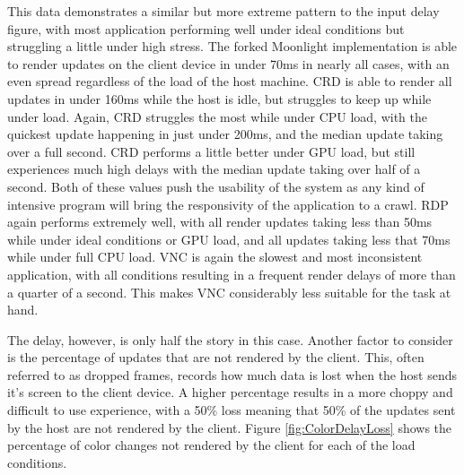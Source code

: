 This data demonstrates a similar but more extreme pattern to the input delay figure, with most application performing well under ideal conditions but struggling a little under high stress.
The forked Moonlight implementation is able to render updates on the client device in under 70ms in nearly all cases, with an even spread regardless of the load of the host machine.
CRD is able to render all updates in under 160ms while the host is idle, but struggles to keep up while under load.
Again, CRD struggles the most while under CPU load, with the quickest update happening in just under 200ms, and the median update taking over a full second.
CRD performs a little better under GPU load, but still experiences much high delays with the median update taking over half of a second.
Both of these values push the usability of the system as any kind of intensive program will bring the responsivity of the application to a crawl.
RDP again performs extremely well, with all render updates taking less than 50ms while under ideal conditions or GPU load, and all updates taking less that 70ms while under full CPU load.
VNC is again the slowest and most inconsistent application, with all conditions resulting in a frequent render delays of more than a quarter of a second.
This makes VNC considerably less suitable for the task at hand.

The delay, however, is only half the story in this case.
Another factor to consider is the percentage of updates that are not rendered by the client. 
This, often referred to as dropped frames, records how much data is lost when the host sends it's screen to the client device.
A higher percentage results in a more choppy and difficult to use experience, with a 50\% loss meaning that 50\% of the updates sent by the host are not rendered by the client.
Figure \ref{fig:ColorDelayLoss} shows the percentage of color changes not rendered by the client for each of the load conditions.

